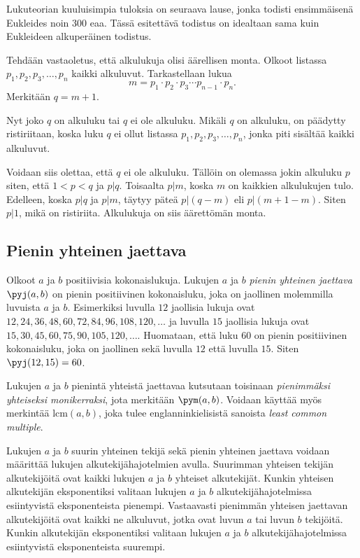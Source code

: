 Lukuteorian kuuluisimpia tuloksia on seuraava lause, jonka todisti ensimmäisenä Eukleides noin 300 eaa. Tässä esitettävä todistus on idealtaan sama kuin Eukleideen alkuperäinen todistus.


\begin{todistus}
Tehdään vastaoletus, että alkulukuja olisi äärellisen monta. Olkoot listassa
$p_1,p_2,p_3,\ldots,p_n$ kaikki alkuluvut. Tarkastellaan lukua
\[
m = p_1\cdot p_2\cdot p_3 \cdots p_{n-1}\cdot p_n.
\]
Merkitään $q=m+1$.

Nyt joko $q$ on alkuluku tai $q$ ei ole alkuluku. Mikäli $q$ on alkuluku, on päädytty ristiriitaan, koska luku $q$ ei ollut listassa $p_1,p_2,p_3,\ldots,p_n$, jonka piti sisältää kaikki alkuluvut.

Voidaan siis olettaa, että $q$ ei ole alkuluku. Tällöin on olemassa jokin alkuluku $p$ siten, että $1<p<q$ ja $p|q$. Toisaalta $p|m$, koska $m$ on kaikkien alkulukujen tulo. Edelleen, koska $p|q$ ja $p|m$, täytyy päteä $p|(q-m)$ eli $p|(m+1-m)$. Siten $p|1$, mikä on ristiriita. Alkulukuja on siis äärettömän monta.
\end{todistus}


\subsection*{Pienin yhteinen jaettava}
Olkoot $a$ ja $b$ positiivisia kokonaislukuja. Lukujen $a$ ja $b$ {\em pienin yhteinen jaettava} $\pyj(a,b)$ on pienin positiivinen kokonaisluku, joka on jaollinen molemmilla luvuista $a$ ja $b$. Esimerkiksi luvulla $12$ jaollisia lukuja ovat $12, 24, 36, 48, 60, 72, 84, 96, 108, 120, \ldots$ ja luvulla $15$ jaollisia lukuja ovat $15, 30, 45, 60, 75, 90, 105, 120, \ldots$. Huomataan, että luku $60$ on pienin positiivinen kokonaisluku, joka on jaollinen sekä luvulla $12$ että luvulla $15$. Siten $\pyj(12, 15) = 60$.

Lukujen $a$ ja $b$ pienintä yhteistä jaettavaa kutsutaan toisinaan {\em pienimmäksi yhteiseksi monikerraksi}, jota merkitään $\pym(a,b)$. Voidaan käyttää myös merkintää $\mathrm{lcm}(a,b)$, joka tulee englanninkielisistä sanoista {\em least common multiple}.

Lukujen $a$ ja $b$ suurin yhteinen tekijä sekä pienin yhteinen jaettava voidaan määrittää lukujen alkutekijähajotelmien avulla. Suurimman yhteisen tekijän alkutekijöitä ovat kaikki lukujen $a$ ja $b$ yhteiset alkutekijät. Kunkin yhteisen alkutekijän eksponentiksi valitaan lukujen $a$ ja $b$ alkutekijähajotelmissa esiintyvistä eksponenteista pienempi. Vastaavasti pienimmän yhteisen jaettavan alkutekijöitä ovat kaikki ne alkuluvut, jotka ovat luvun $a$ tai luvun $b$ tekijöitä. Kunkin alkutekijän eksponentiksi valitaan lukujen $a$ ja $b$ alkutekijähajotelmissa esiintyvistä eksponenteista suurempi.

